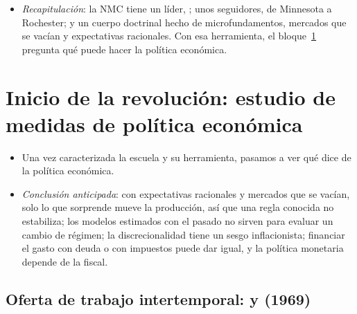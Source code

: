 \documentclass[11pt]{article}
\begin{document}
\begin{itemize}
\item \emph{Recapitulación}: la NMC tiene un líder, ; unos seguidores, de Minnesota a Rochester; y un cuerpo doctrinal hecho de microfundamentos, mercados que se vacían y expectativas racionales. Con esa herramienta, el bloque~\ref{sec:inicio} pregunta qué puede hacer la política económica.
\end{itemize}


\section{Inicio de la revolución:\cortetitulo{} estudio de medidas de política económica}\label{sec:inicio}

\begin{itemize}
\item Una vez caracterizada la escuela y su herramienta, pasamos a ver qué dice de la política económica.
\item \emph{Conclusión anticipada}: con expectativas racionales y mercados que se vacían, solo lo que sorprende mueve la producción, así que una regla conocida no estabiliza; los modelos estimados con el pasado no sirven para evaluar un cambio de régimen; la discrecionalidad tiene un sesgo inflacionista; financiar el gasto con deuda o con impuestos puede dar igual, y la política monetaria depende de la fiscal.
\end{itemize}

\subsection{Oferta de trabajo intertemporal:  y  (1969)}\label{sec:lucas-rapping}
\end{document}
